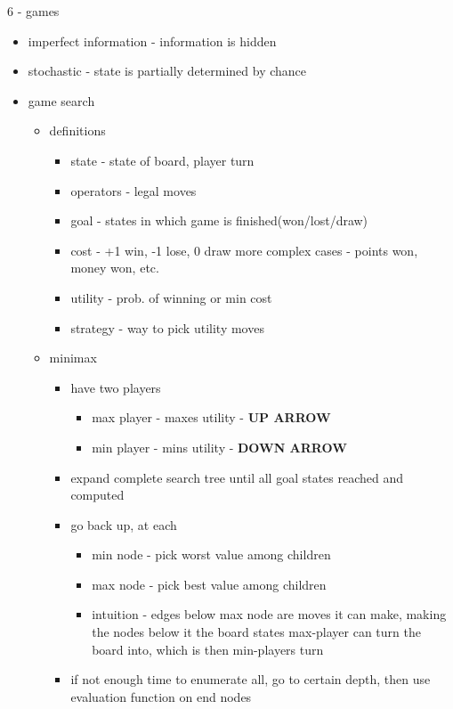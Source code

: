 \documentclass[11pt]{article}
\begin{document}
\begin{description}
\item 6 - games
\begin{itemize}
	\item imperfect information - information is hidden
	\item stochastic - state is partially determined by chance
	\item game search
	\begin{itemize}
		\item definitions
		\begin{itemize}
			\item state - state of board, player turn
			\item operators - legal moves
			\item goal - states in which game is finished(won/lost/draw)
			\item cost - +1 win, -1 lose, 0 draw
			\subitem more complex cases - points won, money won, etc.
			\item utility - prob. of winning or min cost
			\item strategy - way to pick utility moves
		\end{itemize}
		\item minimax
		\begin{itemize}
			\item have two players
			\begin{itemize}
				\item max player - maxes utility - \textbf{UP ARROW}
				\item min player - mins utility - \textbf{DOWN ARROW}
			\end{itemize}
			\item expand complete search tree until all goal states reached and computed
			\item go back up, at each
			\begin{itemize}
				\item min node - pick worst value among children
				\item max node - pick best value among children
				\item intuition - edges below max node are moves it can make, making the nodes below it the board states max-player can turn the board into, which is then min-players turn
			\end{itemize}
			\item if not enough time to enumerate all, go to certain depth, then use evaluation function on end nodes
		\end{itemize}
	

\end{itemize}
\end{itemize}
\end{description}
\end{document}
